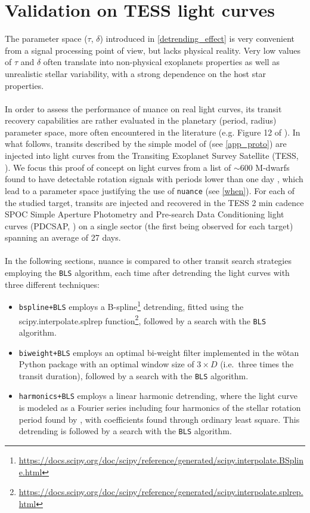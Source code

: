 \documentclass{aastex631}
\newcommand{\nuance}{\texttt{nuance}}
\newcommand{\footlink}[1]{\footnote{\url{#1}}}
\begin{document}
\section{Validation on TESS light curves}\label{real}

The parameter space ($\tau$, $\delta$) introduced in \autoref{detrending_effect} is very convenient from a signal processing point of view, but lacks physical reality. Very low values of $\tau$ and $\delta$ often translate into non-physical exoplanets properties as well as unrealistic stellar variability, with a strong dependence on the host star properties. \\\\
In order to assess the performance of \textsf{nuance} on real light curves, its transit recovery capabilities are rather evaluated in the planetary (period, radius) parameter space, more often encountered in the literature (e.g. Figure 12 of \citealt{Delrez2022}). In what follows, transits described by the simple model of \cite{protopapas} (see \autoref{app_proto}) are injected into light curves from the Transiting Exoplanet Survey Satellite (TESS, \citealt{tess}). We focus this proof of concept on light curves from a list of $\sim$600 M-dwarfs found to have detectable rotation signals with periods lower than one day \citep{Ramsay2020}, which lead to a parameter space justifying the use of \nuance{} (see \autoref{when}). For each of the studied target, transits are injected and recovered in the TESS 2 min cadence SPOC Simple Aperture Photometry and Pre-search Data Conditioning light curves (PDCSAP, \citealt{spoc}) on a single sector (the first being observed for each target) spanning an average of 27 days.\\\\
In the following sections, \textsf{nuance} is compared to other transit search strategies employing the \texttt{BLS} algorithm, each time after detrending the light curves with three different techniques:
\begin{itemize}
    \item \texttt{bspline+BLS} employs a B-spline\footlink{https://docs.scipy.org/doc/scipy/reference/generated/scipy.interpolate.BSpline.html} detrending, fitted using the \textsf{scipy.interpolate.splrep} function\footlink{https://docs.scipy.org/doc/scipy/reference/generated/scipy.interpolate.splrep.html}, followed by a search with the \texttt{BLS} algorithm.
    \item \texttt{biweight+BLS} employs an optimal bi-weight filter implemented in the \textsf{wõtan} Python package \citep{wotan} with an optimal window size of $3\times D$ (i.e.\, three times the transit duration), followed by a search with the \texttt{BLS} algorithm.
    \item \texttt{harmonics+BLS} employs a linear harmonic detrending, where the light curve is modeled as a Fourier series including four harmonics of the stellar rotation period found by \cite{Ramsay2020}, with coefficients found through ordinary least square. This detrending is followed by a search with the \texttt{BLS} algorithm.
\end{itemize}
\end{document}
